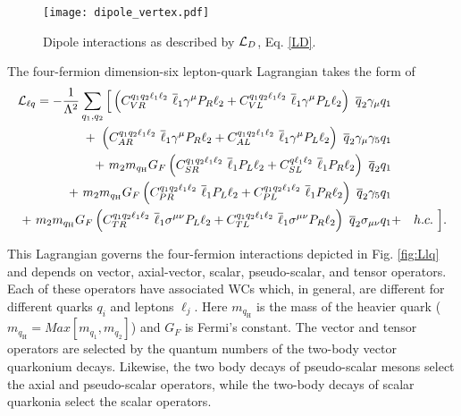 \documentclass[12pt]{article}
\begin{document}
\begin{figure}[htbp]
    \centering
        \texttt{[image: dipole\_vertex.pdf]}
        \vspace{2.5cm}
    \caption{Dipole interactions as described by ${\cal L}_D$, Eq. \ref{LD}.}
    \label{fig:LD}
\end{figure}


The four-fermion dimension-six lepton-quark Lagrangian takes the form of
%
\begin{eqnarray}\label{Llq}
{\cal L}_{\ell q} = -\frac{1}{\Lambda^2} \sum_{q_1, q_2} \Big[
\left( C_{VR}^{q_1 q_2 \ell_1\ell_2} \ \overline\ell_1 \gamma^\mu P_R \ell_2 + 
C_{VL}^{q_1 q_2 \ell_1\ell_2} \ \overline\ell_1 \gamma^\mu P_L \ell_2 \right) \ \overline q_2 \gamma_\mu q_1 &&
\nonumber \\
+ \
\left( C_{AR}^{q_1 q_2 \ell_1\ell_2} \ \overline\ell_1 \gamma^\mu P_R \ell_2 + 
C_{AL}^{q_1 q_2 \ell_1\ell_2} \ \overline\ell_1 \gamma^\mu P_L \ell_2 \right) \ \overline q_2 \gamma_\mu \gamma_5 q_1 &&
\nonumber \\
+ \
m_2 m_{q_{\text{H}}} G_F \left( C_{SR}^{q_1 q_2 \ell_1\ell_2} \ \overline\ell_1 P_L \ell_2 + 
C_{SL}^{q\ell_1\ell_2} \ \overline\ell_1 P_R \ell_2 \right) \ \overline q_2 q_1 &&
\\
+ \
m_2 m_{q_{\text{H}}} G_F \left( C_{PR}^{q_1 q_2 \ell_1\ell_2} \ \overline\ell_1 P_L \ell_2 + 
C_{PL}^{q_1 q_2 \ell_1\ell_2} \ \overline\ell_1 P_R \ell_2 \right) \ \overline q_2 \gamma_5 q_1 
\nonumber \\
+ \
m_2 m_{q_{\text{H}}}G_F \left( C_{TR}^{q_1 q_2 \ell_1\ell_2} \ \overline\ell_1 \sigma^{\mu\nu} P_L \ell_2 + 
C_{TL}^{q_1 q_2 \ell_1\ell_2} \ \overline\ell_1 \sigma^{\mu\nu} P_R \ell_2 \right) \ \overline q_2 \sigma_{\mu\nu} q_1 
 &+& h.c. ~ \Big] .
\nonumber
\end{eqnarray}
% 

This Lagrangian governs the four-fermion interactions depicted in Fig. \ref{fig:Llq} and depends on vector, 
axial-vector, scalar, pseudo-scalar, and tensor operators.  Each of these operators have associated WCs which, in 
general, are different for different quarks $q_i$ and leptons $\ell_j$.  Here $m_{q_{\text{H}}}$ is 
the mass of the heavier quark ($m_{q_{\text{H}}} = Max[m_{q_1},  m_{q_2}]$) and $G_F$ is Fermi's constant.  
The vector and tensor operators are selected by the quantum numbers of the two-body vector quarkonium decays.  
Likewise, the two body decays of pseudo-scalar mesons select the axial and pseudo-scalar operators, while the 
two-body decays of scalar quarkonia select the scalar operators.
\end{document}
